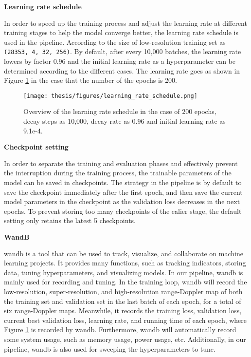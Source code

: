 \begin{spacing}{1.5}
\textbf{\large{Learning rate schedule}}
\end{spacing}
In order to speed up the training process and adjust the learning rate at different training stages to help the model converge better, the learning rate schedule is used in the pipeline. According to the size of low-resolution training set as \texttt{(28353, 4, 32, 256)}. By default, after every 10,000 batches, the learning rate lowers by factor 0.96 and the initial learning rate as a hyperparameter can be determined according to the different cases. The learning rate goes as shown in Figure \ref{overview of the learning rate schedule} in the case that the number of the epochs is 200.

\begin{figure}
	\centering
	\texttt{[image: thesis/figures/learning\_rate\_schedule.png]}
	\caption{Overview of the learning rate schedule in the case of 200 epochs, decay steps as 10,000, decay rate as 0.96 and initial learning rate as 9.1e-4.}
	\label{overview of the learning rate schedule}
\end{figure}

\begin{spacing}{1.5}
\textbf{\large{Checkpoint setting}}
\end{spacing}
In order to separate the training and evaluation phases and effectively prevent the interruption during the training process, the trainable parameters of the model can be saved in checkpoints. The strategy in the pipeline is by default to save the checkpoint immediately after the first epoch, and then save the current model parameters in the checkpoint as the validation loss decreases in the next epochs. To prevent storing too many checkpoints of the ealier stage, the default setting only retains the latest 5 checkpoints.

\begin{spacing}{1.5}
\textbf{\large{WandB}}
\end{spacing}
\gls{wandb} \cite{wandb_site_2025} is a tool that can be used to track, visualize, and collaborate on machine learning projects. It provides many functions, such as tracking indicators, storing data, tuning hyperparameters, and visualizing models. In our pipeline, \gls{wandb} is mainly used for recording and tuning. In the training loop, \gls{wandb} will record the low-resolution, super-resolution, and high-resolution range-Doppler map of both the training set and validation set in the last batch of each epoch, for a total of six range-Doppler maps. Meanwhile, it records the training loss, validation loss, current best validation loss, learning rate, and running time of each epoch, where Figure \ref{overview of the learning rate schedule} is recorded by \gls{wandb}. Furthermore, \gls{wandb} will automatically record some system usage, such as memory usage, power usage, etc. Additionally, in our pipeline, \gls{wandb} is also used for sweeping the hyperparameters to tune.

